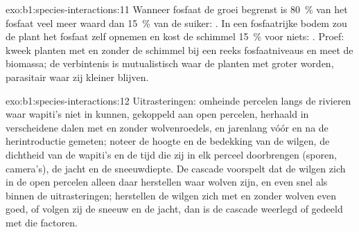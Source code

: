 \begin{solution}{exo:b1:species-interactions:11}
Wanneer fosfaat de groei begrenst is \qty{80}{\%} van het fosfaat veel meer
waard dan \qty{15}{\%} van de suiker: . In een fosfaatrijke bodem
zou de plant het fosfaat zelf opnemen en kost de schimmel \qty{15}{\%} voor
niets: . Proef: kweek planten met en zonder de schimmel bij een
reeks fosfaatniveaus en meet de biomassa; de verbintenis is mutualistisch
waar de planten met  groter worden, parasitair waar zij kleiner
blijven.
\end{solution}

\begin{solution}{exo:b1:species-interactions:12}
Uitrasteringen: omheinde percelen langs de rivieren waar wapiti's niet in
kunnen, gekoppeld aan open percelen, herhaald in verscheidene dalen met en
zonder wolvenroedels, en jarenlang vóór en na de herintroductie gemeten;
noteer de hoogte en de bedekking van de wilgen, de dichtheid van de wapiti's
en de tijd die zij in elk perceel doorbrengen (sporen, camera's), de jacht en
de sneeuwdiepte. De cascade voorspelt dat de wilgen zich in de open percelen
alleen daar herstellen waar wolven zijn, en even snel als binnen de
uitrasteringen; herstellen de wilgen zich met en zonder wolven even goed, of
volgen zij de sneeuw en de jacht, dan is de cascade weerlegd of gedeeld met
die factoren.
\end{solution}

